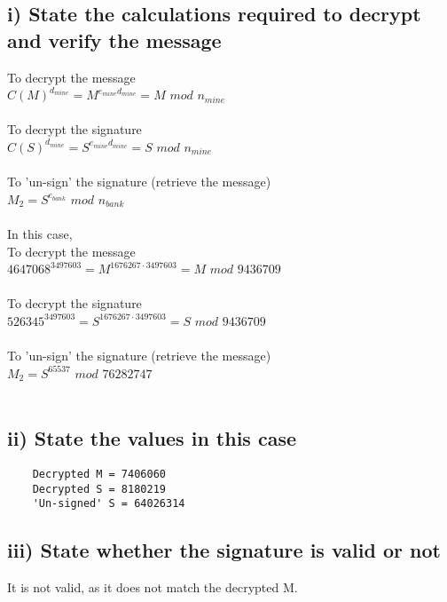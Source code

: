 \documentclass[a4paper,12pt]{article}
\begin{document}
\subsection*{i) State the calculations required to decrypt and verify the message}
To decrypt the message\\
$C(M)^{d_{mine}} = M^{e_{mine}d_{mine}} = M$ $mod$ $n_{mine}$\\\\
To decrypt the signature\\
$C(S)^{d_{mine}} = S^{e_{mine}d_{mine}} = S$ $mod$ $n_{mine}$\\\\
To 'un-sign' the signature (retrieve the message)\\
$M_2 = S^{e_{bank}}$ $mod$ $n_{bank}$\\\\
\newpage \noindent In this case,\\
To decrypt the message\\
$4647068^{3497603} = M^{1676267\cdot 3497603} = M$ $mod$ $9436709$\\\\
To decrypt the signature\\
$526345^{3497603} = S^{1676267\cdot 3497603} = S$ $mod$ $9436709$\\\\
To 'un-sign' the signature (retrieve the message)\\
$M_2 = S^{65537}$ $mod$ $76282747$\\\\

\subsection*{ii) State the values in this case}
\begin{verbatim}
    Decrypted M = 7406060
    Decrypted S = 8180219
    'Un-signed' S = 64026314
\end{verbatim}

\subsection*{iii) State whether the signature is valid or not}
It is not valid, as it does not match the decrypted M.
\end{document}
